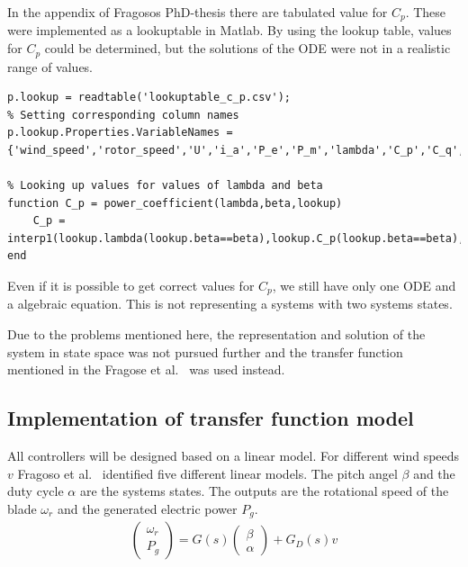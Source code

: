 In the appendix of Fragosos PhD-thesis there are tabulated value for $C_p$.
These were implemented as a lookuptable in Matlab.
By using the lookup table, values for $C_p$ could be determined, but the solutions of the ODE were not in a realistic range of values.

\begin{lstlisting}[style=Matlab-editor,caption={Matlab function for lookuptable. With this function we can get a corresponding $C_p$ value for given $\beta$ and $\lambda$. The \texttt{.csv}-file can be found in the GitHub repository under},captionpos=b,label={list:analysis:lookup}]
% Loading tabulated values as .csv file
p.lookup = readtable('lookuptable_c_p.csv');
% Setting corresponding column names 
p.lookup.Properties.VariableNames = {'wind_speed','rotor_speed','U','i_a','P_e','P_m','lambda','C_p','C_q','beta'};

% Looking up values for values of lambda and beta
function C_p = power_coefficient(lambda,beta,lookup)
    C_p = interp1(lookup.lambda(lookup.beta==beta),lookup.C_p(lookup.beta==beta),lambda);
end
\end{lstlisting}

Even if it is possible to get correct values for $C_p$, we still have only one ODE and a algebraic equation.
This is not representing a systems with two systems states.

Due to the problems mentioned here, the representation and solution of the system in state space was not pursued further and the transfer function mentioned in the Fragose et al.~ was used instead.

\subsection{Implementation of transfer function model} \label{sec:analysis:tf}

All controllers will be designed based on a linear model.
For different wind speeds $v$ Fragoso et al.~ identified five different linear models.
The pitch angel $\beta$ and the duty cycle $\alpha$ are the systems states.
The outputs are the rotational speed of the blade $\omega_r$ and the generated electric power $P_g$.
\begin{align}
    \begin{pmatrix}
        \omega_r \\
        P_g
      \end{pmatrix} = 
      G(s) 
      \begin{pmatrix}
        \beta \\
        \alpha
      \end{pmatrix} + G_D(s) v
\end{align}

